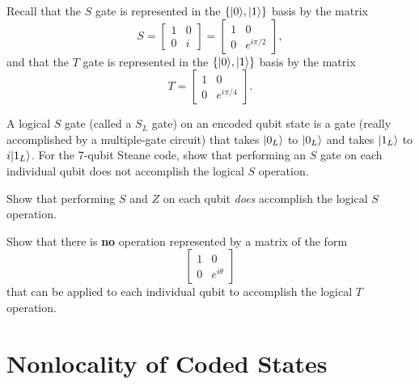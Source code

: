 \documentclass{../phys084}
\begin{document}
\begin{exercise}
  Recall that the \(S\) gate is represented in the
  \(\{\lvert0\rangle,\lvert1\rangle\}\) basis by the matrix
  \[
    S =
    \begin{bmatrix} 1 & 0 \\ 0 & i \end{bmatrix} =
    \begin{bmatrix} 1 & 0 \\ 0 & e^{i \pi/2} \end{bmatrix},
  \]
  and that the \(T\) gate is represented in the \(\{\lvert0\rangle,\lvert1\rangle\}\)
  basis by the matrix
  \[
    T = \begin{bmatrix} 1 & 0 \\ 0 & e^{i \pi/4} \end{bmatrix}.
  \]

  \begin{problems}
  \item A logical \(S\) gate (called a \(S_L\) gate) on an encoded
    qubit state is a gate (really accomplished by a multiple-gate
    circuit) that takes \(\lvert0_L\rangle\) to \(\lvert0_L\rangle\) and takes
    \(\lvert1_L\rangle\) to \(i \lvert1_L\rangle\).  For the 7-qubit Steane code,
    show that performing an \(S\) gate on each individual qubit does
    not accomplish the logical \(S\) operation.
  \item Show that performing \(S\) and \(Z\) on each qubit
    \textit{does} accomplish the logical \(S\) operation.
  \item Show that there is \textbf{no} operation represented by a
    matrix of the form
    \[
      \begin{bmatrix} 1 & 0 \\ 0 & e^{i\theta} \end{bmatrix}
    \]
    that can be applied to each individual qubit to accomplish the
    logical \(T\) operation.
  \end{problems}
\end{exercise}

\begin{solution}

\end{solution}

\section{Nonlocality of Coded States}
\end{document}
